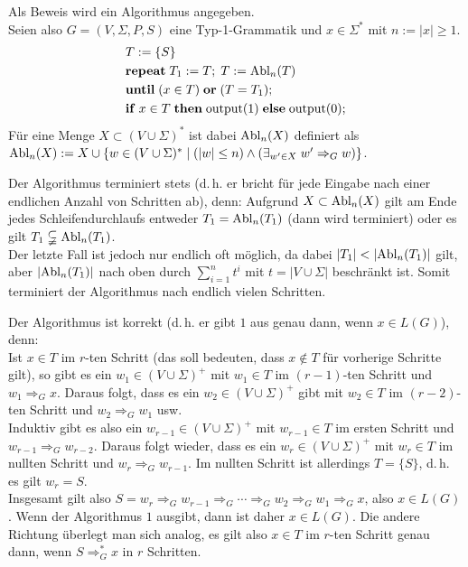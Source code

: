 \begin{Beweis}
    Als Beweis wird ein Algorithmus angegeben.\\
    Seien also $G = (V, \Sigma, P, S)$ eine Typ-1-Grammatik und
    $x \in \Sigma^\ast$ mit $n := |x| \ge 1$.
    \begin{align*}&
        T := \{S\}\\&
        \mathbf{repeat}\; T_1 := T;\; T := \text{Abl}_n(T)\\&
        \mathbf{until}\; (x \in T) \;\mathbf{or}\; (T = T_1);\\&
        \mathbf{if}\; x \in T \;\mathbf{then}\;
        \text{output}(1) \;\mathbf{else}\;
        \text{output}(0);
    \end{align*}
    Für eine Menge $X \subset (V \cup \Sigma)^\ast$ ist dabei
    $\text{Abl}_n(X)$ definiert als\\
    $\text{Abl}_n(X) := X \cup \{w \in (V \cup \Sigma)^\ast \;|\;
    (|w| \le n) \land (\exists_{w' \in X}\; w' \Rightarrow_G w)\}$.
    
    Der Algorithmus terminiert stets
    (d.\,h. er bricht für jede Eingabe nach einer
    endlichen Anzahl von Schritten ab), denn:
    Aufgrund $X \subset \text{Abl}_n(X)$ gilt am Ende jedes Schleifendurchlaufs
    entweder $T_1 = \text{Abl}_n(T_1)$ (dann wird terminiert) oder es gilt
    $T_1 \subsetneqq \text{Abl}_n(T_1)$.\\
    Der letzte Fall ist jedoch nur endlich oft möglich, da
    dabei $|T_1| < |\text{Abl}_n(T_1)|$ gilt, aber
    $|\text{Abl}_n(T_1)|$ nach oben durch $\sum_{i=1}^n t^i$ mit
    $t = |V \cup \Sigma|$ beschränkt ist.
    Somit terminiert der Algorithmus nach endlich vielen Schritten.
    
    Der Algorithmus ist korrekt
    (d.\,h. er gibt $1$ aus genau dann, wenn $x \in L(G)$), denn:\\
    Ist $x \in T$ im $r$-ten Schritt
    (das soll bedeuten, dass $x \notin T$ für vorherige Schritte gilt),
    so gibt es ein $w_1 \in (V \cup \Sigma)^+$ mit $w_1 \in T$
    im $(r - 1)$-ten Schritt und $w_1 \Rightarrow_G x$.
    Daraus folgt, dass es ein $w_2 \in (V \cup \Sigma)^+$ gibt mit $w_2 \in T$
    im $(r - 2)$-ten Schritt und $w_2 \Rightarrow_G w_1$ usw.\\
    Induktiv gibt es also ein $w_{r-1} \in (V \cup \Sigma)^+$ mit
    $w_{r-1} \in T$ im ersten Schritt und $w_{r-1} \Rightarrow_G w_{r-2}$.
    Daraus folgt wieder, dass es ein $w_r \in (V \cup \Sigma)^+$ mit
    $w_r \in T$ im nullten Schritt und $w_r \Rightarrow_G w_{r-1}$.
    Im nullten Schritt ist allerdings $T = \{S\}$, d.\,h. es gilt $w_r = S$.\\
    Insgesamt gilt also $S = w_r \Rightarrow_G w_{r-1} \Rightarrow_G \dotsb
    \Rightarrow_G w_2 \Rightarrow_G w_1 \Rightarrow_G x$, also
    $x \in L(G)$.
    Wenn der Algorithmus $1$ ausgibt, dann ist daher $x \in L(G)$.
    Die andere Richtung überlegt man sich analog, es gilt also
    $x \in T$ im $r$-ten Schritt genau dann, wenn $S \Rightarrow_G^\ast x$
    in $r$ Schritten.
\end{Beweis}


